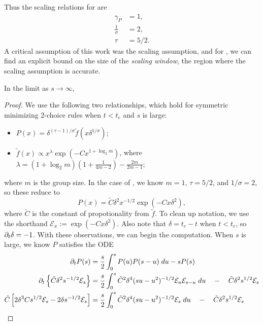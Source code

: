 \documentclass[twoside,10pt]{article}
\begin{document}
Thus the scaling relations for \ER are
\begin{align*}
	\gamma_{P} &= 1,\\
	\frac{1}{\sigma} &= 2,\\
	\tau &= 5/2.
\end{align*}
A critical assumption of this work was the scaling assumption, and for \ER, we can find an explicit bound on the size of the \textit{scaling window}, the region where the scaling assumption is accurate.

\begin{thrm}[]
	In the limit as $s\to \infty$, 
\end{thrm}
\begin{proof}
We use the following two relationships, which hold for symmetric minimizing 2-choice rules when $t < t_c$ and $s$ is large: 
\begin{itemize}
        \item $P(x) = \delta^{(\tau-1)/\sigma} \tilde{f}(x \delta^{1/\sigma})$;
	\item $\tilde{f}(x) \propto x^{\lambda} \exp\left( -Cx^{1 + \log_2 m} \right)$, where $\lambda = (1+\log_2 m)\left( 1 + \frac{1}{4m-2}  \right)-\frac{2m}{2m-1} $;
\end{itemize}
where $m$ is the group size. In the case of \ER, we know $m=1$, $\tau=5/2$, and $1/\sigma = 2$, so these reduce to
\[
	P(x) = \tilde{C} \delta^{2} x^{-1/2} \exp\left( -Cx \delta^{2} \right),
\] 
where $ \tilde{C}$ is the constant of propotionality from $\tilde{f}$. To clean up notation, we use the shorthand $\mathcal{E}_x := \exp\left( -C x \delta^{2} \right)$. Also note that $\delta = t_c-t$ when $t < t_c$, so $\partial_{t}{\delta} =-1$. With these observations, we can begin the computation. When $s$ is large, we know $P$ satisfies the ODE 
\begin{align*}
        \p_{t}{P}(s) &= \frac{s}{2} \int_{0}^{s} P(u)P(s-u)\;du - sP(s) \\
	\p_{t}\left\{ \tilde{C} \delta^{2}s^{-1/2}\mathcal{E}_{s} \right\} &= \frac{s}{2} \int_{0}^{s} \tilde{C}^{2}\delta^{4}(su-u^2)^{-1/2} \mathcal{E}_{u}\mathcal{E}_{s-u} \; du \quad-\quad \tilde{C}\delta^{2}s^{1/2}\mathcal{E}_{s} \\
	\tilde{C} \left[ 2\delta^{3}Cs^{1/2} \mathcal{E}_s - 2\delta s^{-1/2} \mathcal{E}_{s} \right] &= \frac{s}{2} \int_{0}^{s} \tilde{C}^{2}\delta^{4}(su-u^2)^{-1/2} \mathcal{E}_{s} \; du \quad-\quad \tilde{C}\delta^{2}s^{1/2}\mathcal{E}_{s} \\

\end{align*}
\end{proof}
\end{document}
